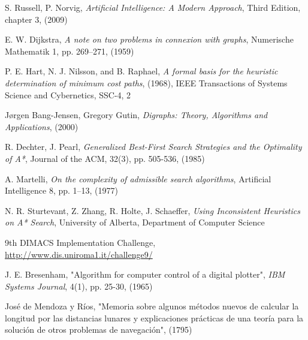 \documentclass[a4paper,10pt]{report}
\begin{document}
\begin{thebibliography}{99}

 S. Russell, P. Norvig, \textsl{Artificial Intelligence: A Modern Approach}, Third Edition, chapter 3, (2009)

 E. W. Dijkstra, \textsl{A note on two problems in connexion with graphs}, Numerische Mathematik 1, pp. 269–271, (1959)

 P. E. Hart, N. J. Nilsson, and B. Raphael, \textsl{A formal basis for the heuristic determination of minimum cost paths}, (1968), IEEE Transactions of Systems Science and Cybernetics, SSC-4, 2

 Jørgen Bang-Jensen, Gregory Gutin, \textsl{Digraphs: Theory, Algorithms and Applications}, (2000)

 R. Dechter, J. Pearl, \textsl{Generalized Best-First Search Strategies and the Optimality of A*}, Journal of the ACM, 32(3), pp. 505-536, (1985)

 A. Martelli, \textsl{On the complexity of admissible search algorithms}, Artificial Intelligence 8, pp. 1–13, (1977)

 N. R. Sturtevant, Z. Zhang, R. Holte, J. Schaeffer, \textsl{Using Inconsistent Heuristics on A* Search}, University of Alberta, Department of Computer Science

 9th DIMACS Implementation Challenge,\\
\url{http://www.dis.uniroma1.it/challenge9/}

 J. E. Bresenham, "Algorithm for computer control of a digital plotter", \textsl{IBM Systems Journal}, 4(1), pp. 25-30, (1965)

 José de Mendoza y Ríos, "Memoria sobre algunos métodos nuevos de calcular la longitud por las distancias lunares y explicaciones prácticas de una teoría para la solución de otros problemas de navegación", (1795)

\end{thebibliography}
\end{document}
